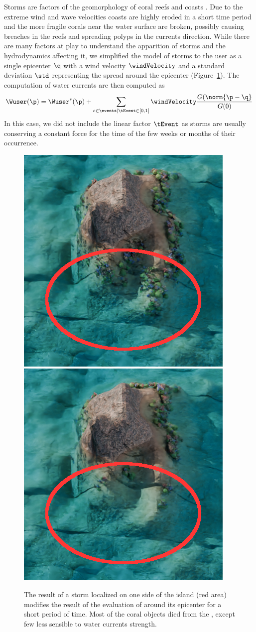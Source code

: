 Storms are factors of the geomorphology of coral reefs \cite{VilaConcejo2016, Oron2023} and coasts \cite{Dominguez2005, Cowart2010}. Due to the extreme wind and wave velocities coasts are highly eroded in a short time period and the more fragile corals near the water surface are broken, possibly causing breaches in the reefs and spreading polyps in the currents direction. While there are many factors at play to understand the apparition of storms and the hydrodynamics affecting it, we simplified the model of storms to the user as a single epicenter $\q$ with a wind velocity $\windVelocity$ and a standard deviation $\std$ representing the spread around the epicenter (Figure~\ref{fig:semantic-representation_storm-event}). The computation of water currents are then computed as 
\begin{align*}
    \Wuser(\p) = \Wuser^*(\p) + \sum_{e \in \events | \tEvent \in [0, 1]} {\windVelocity \frac{G(\norm{\p - \q}}{G(0)}}
\end{align*}
In this case, we did not include the linear factor $\tEvent$ as storms are usually conserving a constant force for the time of the few weeks or months of their occurrence. 

\begin{figure}
    \includegraphics[width = 0.45 \linewidth]{Figures/Interactions/interactionStorm1.png}
    \includegraphics[width = 0.45 \linewidth]{Figures/Interactions/interactionStorm2.png}
    \caption{The result of a storm localized on one side of the island (red area) modifies the result of the evaluation of  around its epicenter for a short period of time. Most of the coral objects died from the , except few  less sensible to water currents strength. }
    \label{fig:semantic-representation_storm-event}
\end{figure}

